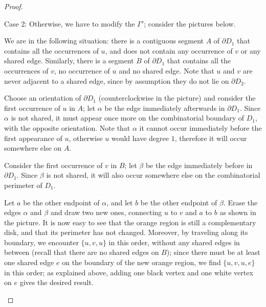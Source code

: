 \begin{proof}
\begin{sideline}{Case 2:}
Otherwise, we have to modify the \dessin{} $\Gamma'$; consider the pictures below.
\begin{enumarabic}
\item We are in the following situation: there is a contiguous segment $A$ of $\partial D_1$ that contains all the occurrences of $u$, and does not contain any occurrence of $v$ or any shared edge. Similarly, there is a segment $B$ of $\partial D_1$ that contains all the occurrences of $v$, no occurrence of $u$ and no shared edge. Note that $u$ and $v$ are never adjacent to a shared edge, since by assumption they do not lie on $\partial D_2$.
\item Choose an orientation of $\partial D_1$ (counterclockwise in the picture) and consider the first occurrence of $u$ in $A$; let $\alpha$ be the edge immediately afterwards in $\partial D_1$. Since $\alpha$ is not shared, it must appear once more on the combinatorial boundary of $D_1$, with the opposite orientation. Note that $\alpha$ it cannot occur immediately before the first appearance of $u$, otherwise $u$ would have degree $1$, therefore it will occur somewhere else on $A$.
\item Consider the first occurrence of $v$ in $B$; let $\beta$ be the edge immediately before in $\partial D_1$. Since $\beta$ is not shared, it will also occur somewhere else on the combinatorial perimeter of $D_1$.
\item Let $a$ be the other endpoint of $\alpha$, and let $b$ be the other endpoint of $\beta$. Erase the edges $\alpha$ and $\beta$ and draw two new ones, connecting $u$ to $v$ and $a$ to $b$ as shown in the picture. It is now easy to see that the orange region is still a complementary disk, and that its perimeter has not changed. Moreover, by traveling along its boundary, we encounter $\{u,v,u\}$ in this order, without any shared edges in between (recall that there are no shared edges on $B$); since there must be at least one shared edge $e$ on the boundary of the new orange region, we find $\{u,v,u,e\}$ in this order; as explained above, adding one black vertex and one white vertex on $e$ gives the desired result.
\end{enumarabic}
\def\picturesetupbase{
\path[use as bounding box] (2,1.4) rectangle (-2,-1.4);
\begin{pgfonlayer}{graph edge below}
\fill[disk 1,postaction={draw,surf boundary}] circle(1);
\end{pgfonlayer}
\path (120:1) pic{black vertex} node[above left] {$u$};
\path (210:1) pic{black vertex} node[left=3pt] {$u$};
}
\end{sideline}
\end{proof}
